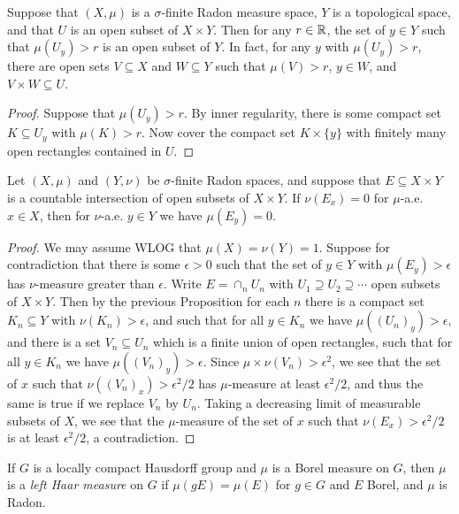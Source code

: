 \documentclass[letterpaper,11pt]{report}
\begin{document}
\begin{prop}\label{radon-product-open} Suppose that $(X,\mu)$ is a $\sigma$-finite Radon measure space, $Y$ is a topological space, and that $U$ is an open subset of $X \times Y$. Then for any $r \in \mathbb{R}$, the set of $y \in Y$ such that $\mu(U_y) > r$ is an open subset of $Y$. In fact, for any $y$ with $\mu(U_y) > r$, there are open sets $V \subseteq X$ and $W \subseteq Y$ such that $\mu(V) > r$, $y \in W$, and $V\times W \subseteq U$.
\end{prop}
\begin{proof} Suppose that $\mu(U_y) > r$. By inner regularity, there is some compact set $K \subseteq U_y$ with $\mu(K) > r$. Now cover the compact set $K\times \{y\}$ with finitely many open rectangles contained in $U$.
\end{proof}

\begin{lem}\label{weak-fubini-radon} Let $(X,\mu)$ and $(Y,\nu)$ be $\sigma$-finite Radon spaces, and suppose that $E \subseteq X\times Y$ is a countable intersection of open subsets of $X\times Y$. If $\nu(E_x) = 0$ for $\mu$-a.e. $x \in X$, then for $\nu$-a.e. $y \in Y$ we have $\mu(E_y) = 0$.
\end{lem}
\begin{proof} We may assume WLOG that $\mu(X) = \nu(Y) = 1$. Suppose for contradiction that there is some $\epsilon > 0$ such that the set of $y \in Y$ with $\mu(E_y) > \epsilon$ has $\nu$-measure greater than $\epsilon$. Write $E = \cap_n U_n$ with $U_1 \supseteq U_2 \supseteq \cdots$ open subsets of $X\times Y$. Then by the previous Proposition for each $n$ there is a compact set $K_n \subseteq Y$ with $\nu(K_n) > \epsilon$, and such that for all $y \in K_n$ we have $\mu((U_n)_y) > \epsilon$, and there is a set $V_n \subseteq U_n$ which is a finite union of open rectangles, such that for all $y \in K_n$ we have $\mu((V_n)_y) > \epsilon$. Since $\mu\times\nu(V_n) > \epsilon^2$, we see that the set of $x$ such that $\nu((V_n)_x) > \epsilon^2/2$ has $\mu$-measure at least $\epsilon^2/2$, and thus the same is true if we replace $V_n$ by $U_n$. Taking a decreasing limit of measurable subsets of $X$, we see that the $\mu$-measure of the set of $x$ such that $\nu(E_x) > \epsilon^2/2$ is at least $\epsilon^2/2$, a contradiction.
\end{proof}

\begin{defn} If $G$ is a locally compact Hausdorff group and $\mu$ is a Borel measure on $G$, then $\mu$ is a \emph{left Haar measure} on $G$ if $\mu(gE) = \mu(E)$ for $g \in G$ and $E$ Borel, and $\mu$ is Radon.
\end{defn}
\end{document}

